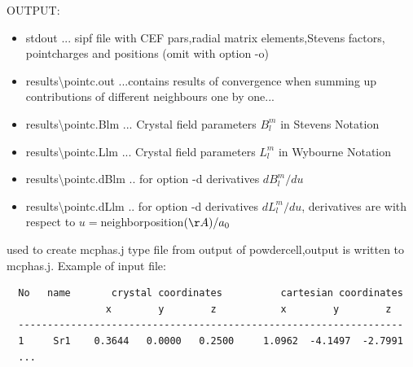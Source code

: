 \begin{description}
OUTPUT:
\begin{itemize}
\item         {\prg stdout} ... sipf file with CEF pars,radial matrix elements,Stevens factors,
                pointcharges and positions (omit with option -o)
\item         {\prg results\textbackslash pointc.out} ...contains results of convergence when summing up
                 contributions of different neighbours one by one...
\item         {\prg results\textbackslash pointc.Blm} ... Crystal field parameters $B_l^m$ in Stevens Notation
\item         {\prg results\textbackslash pointc.Llm} ... Crystal field parameters $L_l^m$ in Wybourne Notation
\item         {\prg results\textbackslash pointc.dBlm} .. for option -d derivatives $dB_l^m/du$
\item         {\prg results\textbackslash pointc.dLlm} .. for option -d  derivatives $dL_l^m/du$,
                  derivatives are with respect to $u=$neighborposition$(\AA)/a_0$            
\end{itemize}
\item [\prg powdercell2j\index{powdercell2j} file:]     used to create mcphas.j type file from %
output of powdercell,output is written to mcphas.j.  Example of input file:
\begin{verbatim}
  No   name       crystal coordinates          cartesian coordinates
                 x        y        z           x        y        z
  ------------------------------------------------------------------
  1     Sr1    0.3644   0.0000   0.2500     1.0962  -4.1497  -2.7991
  ...
  \end{verbatim}


\end{description}
